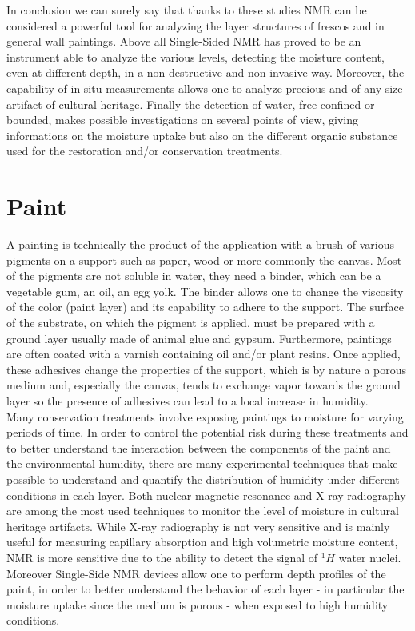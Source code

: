 \documentclass[a4paper,11pt]{report}
\begin{document}
In conclusion we can surely say that thanks to these studies NMR can be considered a powerful tool for analyzing the layer structures of frescos and in general wall paintings. Above all Single-Sided NMR has proved to be an instrument able to analyze the various levels, detecting the moisture content, even at different depth, in a non-destructive and non-invasive way. Moreover, the capability of in-situ measurements allows one to analyze precious and of any size artifact of cultural heritage. Finally the detection of water, free confined or bounded, makes possible investigations on several points of view, giving informations on the moisture uptake but also on the different organic substance used for the restoration and/or conservation treatments. 

\section{Paint}
A painting is technically the product of the application with a brush of various pigments on a support such as paper, wood or more commonly the canvas. Most of the pigments are not soluble in water, they need a binder, which can be a vegetable gum, an oil, an egg yolk. The binder allows one to change the viscosity of the color (paint layer) and its capability to adhere to the support. The surface of the substrate, on which the pigment is applied, must be prepared with a ground layer usually made of animal glue and gypsum\cite{unopaint}. Furthermore, paintings are often coated with a varnish containing oil and/or plant resins. Once applied, these adhesives change the properties of the support, which is by nature a porous medium and, especially the canvas, tends to exchange vapor towards the ground layer so the presence of adhesives can lead to a local increase in humidity\cite{duepaint}.\\
Many conservation treatments involve exposing paintings to moisture for varying periods of time. In order to control the potential risk during these treatments and to better understand the interaction between the components of the paint and the environmental humidity, there are many experimental techniques that make possible to understand and quantify the distribution of humidity under different conditions in each layer. Both nuclear magnetic resonance and X-ray radiography are among the most used techniques to monitor the level of moisture in cultural heritage artifacts. While X-ray radiography is not very sensitive and is mainly useful for measuring capillary absorption and high volumetric moisture content, NMR is more sensitive due to the ability to detect the signal of $^1H$ water nuclei. Moreover Single-Side NMR devices allow one to perform depth profiles of the paint, in order to better understand the behavior of each layer - in particular the moisture uptake since the medium is porous - when exposed to high humidity conditions.\\
\end{document}
